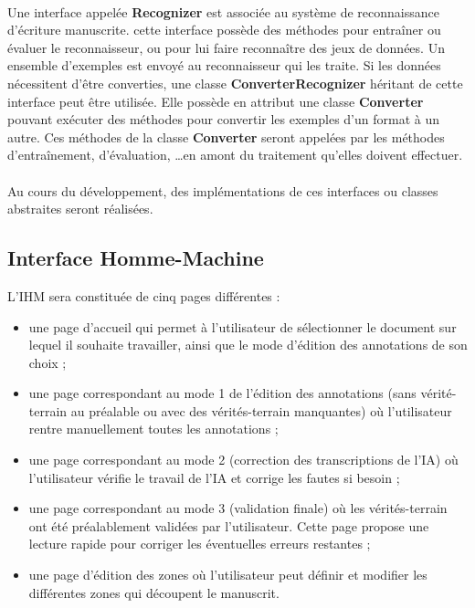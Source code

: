\paragraph{}
Une interface appelée \textbf{Recognizer} est associée au système de
reconnaissance d’écriture manuscrite. cette interface possède des méthodes
pour entraîner ou  évaluer le reconnaisseur, ou pour lui faire reconnaître
des jeux de données. Un ensemble d’exemples est envoyé au reconnaisseur qui
les traite. Si les données nécessitent d’être converties, une classe
\textbf{ConverterRecognizer} héritant de cette interface peut être utilisée.
Elle possède en attribut une classe \textbf{Converter} pouvant exécuter des
méthodes pour convertir les exemples d’un format à un autre. Ces méthodes de
la classe \textbf{Converter} seront appelées par les méthodes d’entraînement,
d’évaluation, \ldots en amont du traitement qu’elles doivent effectuer.

\paragraph{}
Au cours du développement, des implémentations de ces interfaces ou classes
abstraites seront réalisées.

\subsection{Interface Homme-Machine}

L’IHM sera constituée de cinq pages différentes :
\begin{itemize}
\item une page d’accueil qui permet à l’utilisateur de sélectionner le document
sur lequel il souhaite travailler, ainsi que le mode d’édition des annotations
de son choix ;
\item une page correspondant au mode 1 de l’édition des annotations
(sans vérité-terrain au préalable ou avec des vérités-terrain manquantes) où
l’utilisateur rentre manuellement toutes les annotations ;
\item une page correspondant au mode 2 (correction des transcriptions de l’IA)
où l’utilisateur vérifie le travail de l’IA et corrige les fautes si besoin ;
\item une page correspondant au mode 3 (validation finale) où les
vérités-terrain ont été préalablement validées par l’utilisateur. Cette page
propose une lecture rapide pour corriger les éventuelles erreurs restantes ;
\item une page d’édition des zones où l’utilisateur peut définir et modifier
les différentes zones qui découpent le manuscrit.
\end{itemize}

